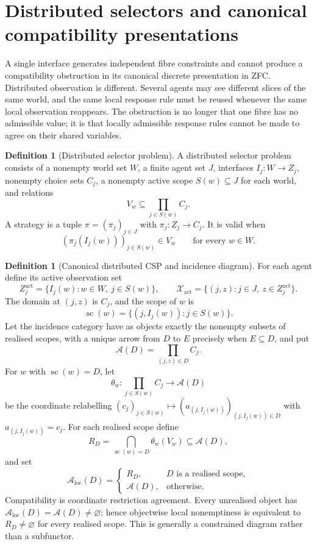 \documentclass[11pt]{article}
\theoremstyle{plain}
\theoremstyle{definition}
\newtheorem{definition}[theorem]{Definition}
\theoremstyle{remark}
\newcommand{\LocalAdm}{\mathcal{A}_{\mathrm{loc}}}
\begin{document}
\section{Distributed selectors and canonical compatibility presentations}\label{sec:distributed}

A single interface generates independent fibre constraints and cannot produce a
compatibility obstruction in its canonical discrete presentation in ZFC.
Distributed observation is different. Several agents may see different slices of
the same world, and the same local response rule must be reused whenever the
same local observation reappears. The obstruction is no longer that one fibre has
no admissible value; it is that locally admissible response rules cannot be made
to agree on their shared variables.

\begin{definition}[Distributed selector problem]\label{def:distributed}
A distributed selector problem consists of a nonempty world set $W$, a finite
agent set $J$, interfaces $I_j:W\to Z_j$, nonempty choice sets $C_j$, a nonempty
active scope $S(w)\subseteq J$ for each world, and relations
\[
V_w\subseteq\prod_{j\in S(w)}C_j.
\]
A strategy is a tuple $\pi=(\pi_j)_{j\in J}$ with
$\pi_j:Z_j\to C_j$. It is valid when
\[
(\pi_j(I_j(w)))_{j\in S(w)}\in V_w
\qquad\text{for every }w\in W.
\]
\end{definition}

\begin{definition}[Canonical distributed CSP and incidence diagram]
\label{def:distributed-csp}
For each agent define its active observation set
\[
Z_j^{\mathrm{act}}=\{I_j(w):w\in W,\ j\in S(w)\},
\qquad
\mathcal X_{\mathrm{act}}
=\{(j,z):j\in J,\ z\in Z_j^{\mathrm{act}}\}.
\]
The domain at $(j,z)$ is $C_j$, and the scope of $w$ is
\[
\operatorname{sc}(w)=\{(j,I_j(w)):j\in S(w)\}.
\]
Let the incidence category have as objects exactly the nonempty subsets of
realised scopes, with a unique arrow from $D$ to $E$ precisely when
$E\subseteq D$, and put
\[
\mathcal A(D)=\prod_{(j,z)\in D}C_j.
\]
For $w$ with $\operatorname{sc}(w)=D$, let
\[
\theta_w:\prod_{j\in S(w)}C_j\to\mathcal A(D)
\]
be the coordinate relabelling
$(c_j)_{j\in S(w)}\mapsto(a_{(j,I_j(w))})_{(j,I_j(w))\in D}$ with
$a_{(j,I_j(w))}=c_j$. For each realised scope define
\[
R_D=\bigcap_{\operatorname{sc}(w)=D}\theta_w(V_w)
\subseteq\mathcal A(D),
\]
and set
\[
\LocalAdm(D)=
\begin{cases}
R_D,&D\text{ is a realised scope},\\
\mathcal A(D),&\text{otherwise}.
\end{cases}
\]
Compatibility is coordinate restriction agreement. Every unrealised object has
$\LocalAdm(D)=\mathcal A(D)\ne\varnothing$; hence objectwise local nonemptiness
is equivalent to $R_D\ne\varnothing$ for every realised scope. This is generally
a constrained diagram rather than a subfunctor.
\end{definition}
\end{document}
